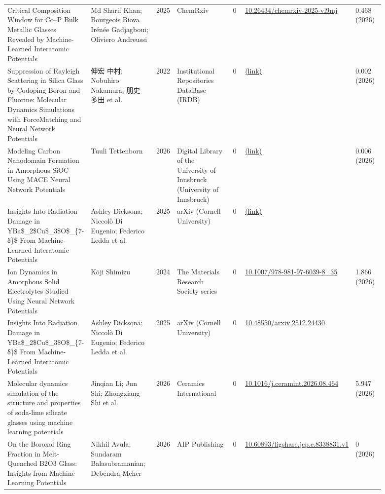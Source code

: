 \documentclass[10pt,a4paper]{article}
\begin{document}
{\begin{longtable}{p{0.192\linewidth}p{0.192\linewidth}p{0.043\linewidth}p{0.192\linewidth}p{0.043\linewidth}p{0.132\linewidth}p{0.096\linewidth}}
Critical Composition Window for Co–P Bulk Metallic Glasses Revealed by Machine-Learned Interatomic Potentials & Md Sharif Khan; Bourgeois Biova Irénée Gadjagboui; Oliviero Andreussi & 2025 & ChemRxiv & 0 & \href{https://doi.org/10.26434/chemrxiv-2025-vl9mj}{10.26434/chemrxiv-2025-vl9mj} & 0.468 (2026) \\
Suppression of Rayleigh Scattering in Silica Glass by Codoping Boron and Fluorine: Molecular Dynamics Simulations with ForceMatching and Neural Network Potentials & 伸宏 中村; Nobuhiro Nakamura; 朋史 多田 et al. & 2022 & Institutional Repositories DataBase (IRDB) & 0 & \href{https://openalex.org/W7145446861}{(link)} & 0.002 (2026) \\
Modeling Carbon Nanodomain Formation in Amorphous SiOC Using MACE Neural Network Potentials & Tuuli Tettenborn & 2026 & Digital Library of the University of Innsbruck (University of Innsbruck) & 0 & \href{https://openalex.org/W7153957297}{(link)} & 0.006 (2026) \\
Insights Into Radiation Damage in YBa\$\_2\$Cu\$\_3\$O\$\_\{7-δ\}\$ From Machine-Learned Interatomic Potentials & Ashley Dicksona; Niccolò Di Eugenio; Federico Ledda et al. & 2025 & arXiv (Cornell University) & 0 & \href{https://openalex.org/W7118052361}{(link)} &  \\
Ion Dynamics in Amorphous Solid Electrolytes Studied Using Neural Network Potentials & Kōji Shimizu & 2024 & The Materials Research Society series & 0 & \href{https://doi.org/10.1007/978-981-97-6039-8_35}{10.1007/978-981-97-6039-8\_35} & 1.866 (2026) \\
Insights Into Radiation Damage in YBa\$\_2\$Cu\$\_3\$O\$\_\{7-δ\}\$ From Machine-Learned Interatomic Potentials & Ashley Dicksona; Niccolò Di Eugenio; Federico Ledda et al. & 2025 & arXiv (Cornell University) & 0 & \href{https://doi.org/10.48550/arxiv.2512.24430}{10.48550/arxiv.2512.24430} &  \\
Molecular dynamics simulation of the structure and properties of soda-lime silicate glasses using machine learning potentials & Jinqian Li; Jun Shi; Zhongxiang Shi et al. & 2026 & Ceramics International & 0 & \href{https://doi.org/10.1016/j.ceramint.2026.08.464}{10.1016/j.ceramint.2026.08.464} & 5.947 (2026) \\
On the Boroxol Ring Fraction in Melt-Quenched B2O3 Glass: Insights from Machine Learning Potentials & Nikhil Avula; Sundaram Balasubramanian; Debendra Meher & 2026 & AIP Publishing & 0 & \href{https://doi.org/10.60893/figshare.jcp.c.8338831.v1}{10.60893/figshare.jcp.c.8338831.v1} & 0 (2026) \\

\end{longtable}}
\end{document}
